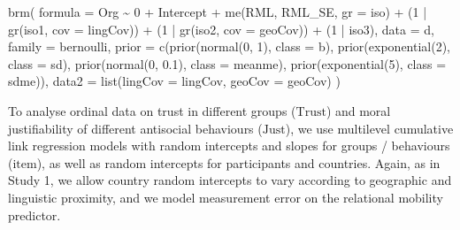 \documentclass[
  man,floatsintext]{apa6}
\newenvironment{Shaded}{\begin{snugshade}}{\end{snugshade}}
\newcommand{\AttributeTok}[1]{\textcolor[rgb]{0.77,0.63,0.00}{#1}}
\newcommand{\DecValTok}[1]{\textcolor[rgb]{0.00,0.00,0.81}{#1}}
\newcommand{\FloatTok}[1]{\textcolor[rgb]{0.00,0.00,0.81}{#1}}
\newcommand{\FunctionTok}[1]{\textcolor[rgb]{0.00,0.00,0.00}{#1}}
\newcommand{\NormalTok}[1]{#1}
\newcommand{\SpecialCharTok}[1]{\textcolor[rgb]{0.00,0.00,0.00}{#1}}
\begin{document}
\begin{Shaded}
\begin{Highlighting}[]
\FunctionTok{brm}\NormalTok{(}
  \AttributeTok{formula =}\NormalTok{ Org }\SpecialCharTok{\textasciitilde{}} \DecValTok{0} \SpecialCharTok{+}\NormalTok{ Intercept }\SpecialCharTok{+} \FunctionTok{me}\NormalTok{(RML, RML\_SE, }\AttributeTok{gr =}\NormalTok{ iso) }\SpecialCharTok{+} 
\NormalTok{    (}\DecValTok{1} \SpecialCharTok{|} \FunctionTok{gr}\NormalTok{(iso1, }\AttributeTok{cov =}\NormalTok{ lingCov)) }\SpecialCharTok{+}\NormalTok{ (}\DecValTok{1} \SpecialCharTok{|} \FunctionTok{gr}\NormalTok{(iso2, }\AttributeTok{cov =}\NormalTok{ geoCov)) }\SpecialCharTok{+} 
\NormalTok{    (}\DecValTok{1} \SpecialCharTok{|}\NormalTok{ iso3), }
  \AttributeTok{data =}\NormalTok{ d, }\AttributeTok{family =}\NormalTok{ bernoulli,}
  \AttributeTok{prior =} \FunctionTok{c}\NormalTok{(}\FunctionTok{prior}\NormalTok{(}\FunctionTok{normal}\NormalTok{(}\DecValTok{0}\NormalTok{, }\DecValTok{1}\NormalTok{), }\AttributeTok{class =}\NormalTok{ b),}
            \FunctionTok{prior}\NormalTok{(}\FunctionTok{exponential}\NormalTok{(}\DecValTok{2}\NormalTok{), }\AttributeTok{class =}\NormalTok{ sd),}
            \FunctionTok{prior}\NormalTok{(}\FunctionTok{normal}\NormalTok{(}\DecValTok{0}\NormalTok{, }\FloatTok{0.1}\NormalTok{), }\AttributeTok{class =}\NormalTok{ meanme),}
            \FunctionTok{prior}\NormalTok{(}\FunctionTok{exponential}\NormalTok{(}\DecValTok{5}\NormalTok{), }\AttributeTok{class =}\NormalTok{ sdme)),}
  \AttributeTok{data2 =} \FunctionTok{list}\NormalTok{(}\AttributeTok{lingCov =}\NormalTok{ lingCov, }\AttributeTok{geoCov =}\NormalTok{ geoCov)}
\NormalTok{  )}
\end{Highlighting}
\end{Shaded}

To analyse ordinal data on trust in different groups (\(\text{Trust}\)) and moral justifiability of different antisocial behaviours (\(\text{Just}\)), we use multilevel cumulative link regression models with random intercepts and slopes for groups / behaviours (\(\text{item}\)), as well as random intercepts for participants and countries. Again, as in Study 1, we allow country random intercepts to vary according to geographic and linguistic proximity, and we model measurement error on the relational mobility predictor.
\end{document}

